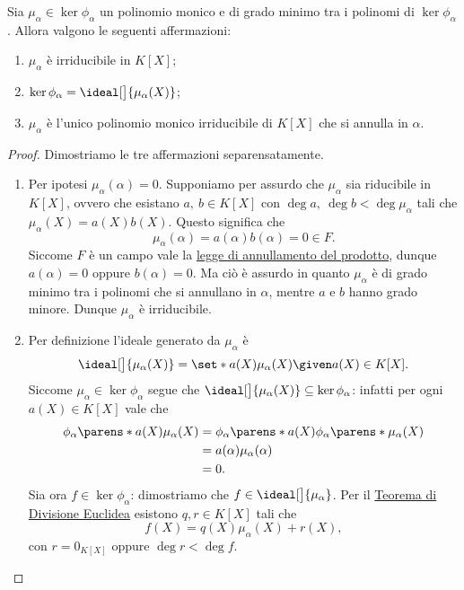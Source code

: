 \begin{proposition}\label{prop:caratt_polinomio_minimo}
    Sia $\mu_\alpha \in \ker \phi_\alpha$ un polinomio monico e di grado minimo tra i polinomi di $\ker \phi_\alpha$. Allora valgono le seguenti affermazioni:
    \begin{enumerate}[label={(\roman*)}]
        \item $\mu_\alpha$ è irriducibile in $K[X]$;
        \item $\ker \phi_\alpha = \ideal[\big]{\mu_\alpha(X)}$;
        \item $\mu_\alpha$ è l'unico polinomio monico irriducibile di $K[X]$ che si annulla in $\alpha$.
    \end{enumerate}
\end{proposition}
\begin{proof}
    Dimostriamo le tre affermazioni separensatamente.
    \begin{enumerate}[label={(\roman*)}]
        \item Per ipotesi $\mu_\alpha(\alpha) = 0$. Supponiamo per assurdo che $\mu_\alpha$ sia riducibile in $K[X]$, ovvero che esistano $a,\ b \in K[X]$ con $\deg a,\ \deg b < \deg \mu_\alpha$ tali che $\mu_\alpha(X) = a(X)b(X)$.
        Questo significa che \[
            \mu_\alpha(\alpha) = a(\alpha)b(\alpha) = 0 \in F.
        \] Siccome $F$ è un campo vale la \hyperref[prop:ann_prod_dominio]{legge di annullamento del prodotto}, dunque $a(\alpha) = 0$ oppure $b(\alpha) = 0$. Ma ciò è assurdo in quanto $\mu_\alpha$ è di grado minimo tra i polinomi che si annullano in $\alpha$, mentre $a$ e $b$ hanno grado minore. Dunque $\mu_\alpha$ è irriducibile.
        \item Per definizione l'ideale generato da $\mu_\alpha$ è \[
            \ideal[\big]{\mu_\alpha(X)} = \set*{a(X)\mu_\alpha(X) \given a(X) \in K[X].} 
        \] Siccome $\mu_\alpha \in \ker \phi_\alpha$ segue che $\ideal[\big]{\mu_\alpha(X)} \subseteq \ker \phi_\alpha$: infatti per ogni $a(X) \in K[X]$ vale che \begin{align*}
            \phi_\alpha\parens*{a(X)\mu_\alpha(X)} &= \phi_\alpha\parens*{a(X)}\phi_\alpha\parens*{\mu_\alpha(X)}\\
            &= a(\alpha)\mu_\alpha(\alpha)\\
            &= 0.
        \end{align*}
        Sia ora $f \in \ker \phi_\alpha$: dimostriamo che $f \in \ideal[\big]{\mu_\alpha}$. Per il \hyperref[th:divisione_euclidea_KX]{Teorema di Divisione Euclidea} esistono $q, r \in K[X]$ tali che \[
            f(X) = q(X)\mu_\alpha(X) + r(X),
        \] con $r = 0_{K[X]}$ oppure $\deg r < \deg f$.


\end{enumerate}
\end{proof}
